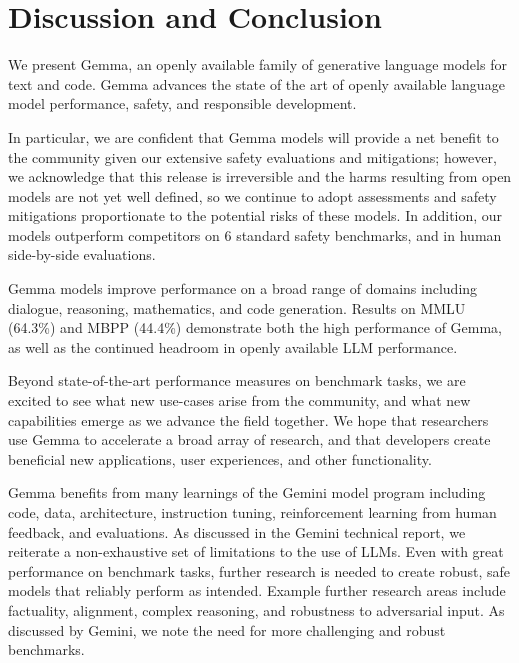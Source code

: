 \documentclass[11pt, a4paper, logo, twocolumn, copyright, nonumbering]{googledeepmind}
\begin{document}
\section{Discussion and Conclusion}

We present Gemma, an openly available family of generative language models for text and code. Gemma advances the state of the art of openly available language model performance, safety, and responsible development.

In particular, we are confident that Gemma models will provide a net benefit to the community given our extensive safety evaluations and mitigations; however, we acknowledge that this release is irreversible and the harms resulting from open models are not yet well defined, so we continue to adopt assessments and safety mitigations proportionate to the potential risks of these models. In addition, our models outperform competitors on 6 standard safety benchmarks, and in human side-by-side evaluations.

Gemma models improve performance on a broad range of domains including dialogue, reasoning, mathematics, and code generation. Results on MMLU (64.3\%) and MBPP (44.4\%) demonstrate both the high performance of Gemma, as well as the continued headroom in openly available LLM performance.

Beyond state-of-the-art performance measures on benchmark tasks, we are excited to see what new use-cases arise from the community, and what new capabilities emerge as we advance the field together. We hope that researchers use Gemma to accelerate a broad array of research, and that developers create beneficial new applications, user experiences, and other functionality.

Gemma benefits from many learnings of the Gemini model program including code, data, architecture, instruction tuning, reinforcement learning from human feedback, and evaluations. As discussed in the Gemini technical report, we reiterate a non-exhaustive set of limitations to the use of LLMs. Even with great performance on benchmark tasks, further research is needed to create robust, safe models that reliably perform as intended. Example further research areas include factuality, alignment, complex reasoning, and robustness to adversarial input. As discussed by Gemini, we note the need for more challenging and robust benchmarks.





\clearpage
\appendix
\onecolumn
\end{document}
